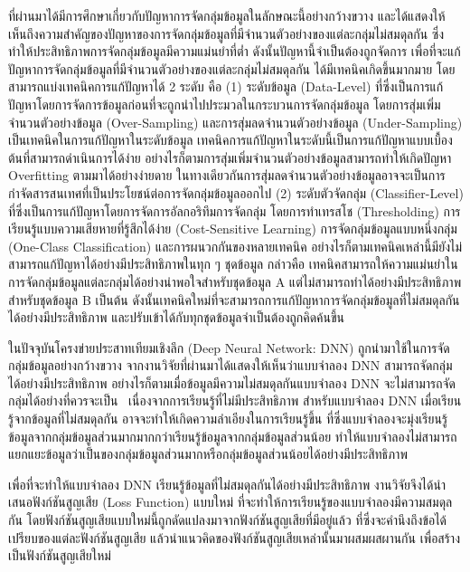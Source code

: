 ที่ผ่านมาได้มีการศึกษาเกี่ยวกับปัญหาการจัดกลุ่มข้อมูลในลักษณะนี้อย่างกว้างขวาง และได้แสดงให้เห็นถึงความสำคัญของปัญหาของการจัดกลุ่มข้อมูลที่มีจำนวนตัวอย่างของแต่ละกลุ่มไม่สมดุลกัน 
ซึ่งทำให้ประสิทธิภาพการจัดกลุ่มข้อมูลมีความแม่นยำที่ต่ำ ดังนั้นปัญหานี้จำเป็นต้องถูกจัดการ \cite{Buda:2017} เพื่อที่จะแก้ปัญหาการจัดกลุ่มข้อมูลที่มีจำนวนตัวอย่างของแต่ละกลุ่มไม่สมดุลกัน 
ได้มีเทคนิคเกิดขึ้นมากมาย โดยสามารถแบ่งเทคนิคการแก้ปัญหาได้ 2 ระดับ คือ (1) ระดับข้อมูล (Data-Level) 
ที่ซึ่งเป็นการแก้ปัญหาโดยการจัดการข้อมูลก่อนที่จะถูกนำไปประมวลในกระบวนการจัดกลุ่มข้อมูล โดยการสุ่มเพิ่มจำนวนตัวอย่างข้อมูล (Over-Sampling) และการสุ่มลดจำนวนตัวอย่างข้อมูล 
(Under-Sampling) เป็นเทคนิคในการแก้ปัญหาในระดับข้อมูล เทคนิคการแก้ปัญหาในระดับนี้เป็นการแก้ปัญหาแบบเบื้องต้นที่สามารถดำเนินการได้ง่าย 
อย่างไรก็ตามการสุ่มเพิ่มจำนวนตัวอย่างข้อมูลสามารถทำให้เกิดปัญหา Overfitting ตามมาได้อย่างง่ายดาย 
ในทางเดียวกันการสุ่มลดจำนวนตัวอย่างข้อมูลอาจจะเป็นการกำจัดสารสนเทศที่เป็นประโยชน์ต่อการจัดกลุ่มข้อมูลออกไป (2) ระดับตัวจัดกลุ่ม (Classifier-Level) 
ที่ซึ่งเป็นการแก้ปัญหาโดยการจัดการอัลกอริทึมการจัดกลุ่ม โดยการทำเทรสโช (Thresholding) การเรียนรู้แบบความเสียหายที่รู้สึกได้ง่าย (Cost-Sensitive Learning) 
การจัดกลุ่มข้อมูลแบบหนึ่งกลุ่ม (One-Class Classification) และการผนวกกันของหลายเทคนิค อย่างไรก็ตามเทคนิคเหล่านี้มียังไม่สามารถแก้ปัญหาได้อย่างมีประสิทธิภาพในทุก ๆ ชุดข้อมูล 
กล่าวคือ เทคนิคสามารถให้ความแม่นยำในการจัดกลุ่มข้อมูลแต่ละกลุ่มได้อย่างน่าพอใจสำหรับชุดข้อมูล A แต่ไม่สามารถทำได้อย่างมีประสิทธิภาพสำหรับชุดข้อมูล B เป็นต้น 
ดังนั้นเทคนิคใหม่ที่จะสามารถการแก้ปัญหาการจัดกลุ่มข้อมูลที่ไม่สมดุลกันได้อย่างมีประสิทธิภาพ และปรับเข้าได้กับทุกชุดข้อมูลจำเป็นต้องถูกคิดค้นขึ้น

ในปัจจุบันโครงข่ายประสาทเทียมเชิงลึก (Deep Neural Network: DNN) ถูกนำมาใช้ในการจัดกลุ่มข้อมูลอย่างกว้างขวาง จากงานวิจัยที่ผ่านมาได้แสดงให้เห็นว่าแบบจำลอง DNN สามารถจัดกลุ่มได้อย่างมีประสิทธิภาพ อย่างไรก็ตามเมื่อข้อมูลมีความไม่สมดุลกันแบบจำลอง DNN จะไม่สามารถจัดกลุ่มได้อย่างที่ควรจะเป็น~\cite{Buda:2017, Hensman:2015} เนื่องจากการเรียนรู้ที่ไม่มีประสิทธิภาพ สำหรับแบบจำลอง DNN เมื่อเรียนรู้จากข้อมูลที่ไม่สมดุลกัน อาจจะทำให้เกิดความลำเอียงในการเรียนรู้ขึ้น ที่ซึ่งแบบจำลองจะมุ่งเรียนรู้ข้อมูลจากกลุ่มข้อมูลส่วนมากมากกว่าเรียนรู้ข้อมูลจากกลุ่มข้อมูลส่วนน้อย ทำให้แบบจำลองไม่สามารถแยกแยะข้อมูลว่าเป็นของกลุ่มข้อมูลส่วนมากหรือกลุ่มข้อมูลส่วนน้อยได้อย่างมีประสิทธิภาพ 

เพื่อที่จะทำให้แบบจำลอง DNN เรียนรู้ข้อมูลที่ไม่สมดุลกันได้อย่างมีประสิทธิภาพ งานวิจัยจึงได้นำเสนอฟังก์ชันสูญเสีย (Loss Function) แบบใหม่ ที่จะทำให้การเรียนรู้ของแบบจำลองมีความสมดุลกัน โดยฟังก์ชันสูญเสียแบบใหม่นี้ถูกดัดแปลงมาจากฟังก์ชันสูญเสียที่มีอยู่แล้ว ที่ซึ่งจะคำนึงถึงข้อได้เปรียบของแต่ละฟังก์ชันสูญเสีย แล้วนำแนวคิดของฟังก์ชันสูญเสียเหล่านั้นมาผสมผสผานกัน เพื่อสร้างเป็นฟังก์ชันสูญเสียใหม่

